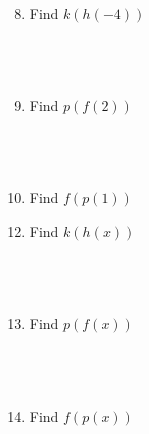 \documentclass{article}
\begin{document}
\noindent
\vspace{2cm}
\\
\begin{minipage}[t]{0.45\textwidth}
    \begin{enumerate}
        \setcounter{enumi}{7}
        \item Find $k(h(-4))$
        \\\\\\\\
        \item Find $p(f(2))$
        \\\\\\\\
        \item Find $f(p(1))$
    \end{enumerate}
\end{minipage}%
\hfill
\begin{minipage}[t]{0.45\textwidth}
    \begin{enumerate}
        \setcounter{enumi}{11} %
        \item Find $k(h(x))$
        \\\\\\\\
        \item Find $p(f(x))$
        \\\\\\\\
        \item Find $f(p(x))$

    \end{enumerate}
\end{minipage}
\end{document}

